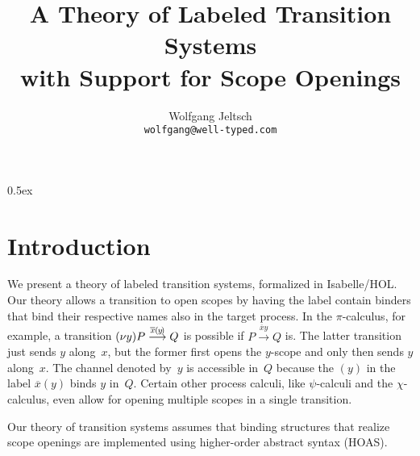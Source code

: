 \documentclass[a4paper,11pt]{article}
\newcommand{\openandsendexample}{
  (\nu y)P
  \overset{\overline{x}\hspace{-0.03em}(\hspace{-.06em}y\hspace{-.12em})}{\longrightarrow}
  Q
}
\begin{document}
\title{A Theory of Labeled Transition Systems\\with Support for Scope Openings}
\author{Wolfgang Jeltsch\\\small\texttt{wolfgang@well-typed.com}}

\maketitle

\tableofcontents

\parindent 0pt\parskip 0.5ex

\section{Introduction}

We present a theory of labeled transition systems, formalized in Isabelle/HOL. Our theory allows
a transition to open scopes by having the label contain binders that bind their respective names
also in the target process. In the $\pi$-calculus, for example, a transition $\openandsendexample$
is possible if $P \overset{\overline{x}y}{\longrightarrow} Q$ is. The latter transition just sends
$y$ along~$x$, but the former first opens the $y$-scope and only then sends $y$ along~$x$. The
channel denoted by~$y$ is accessible in~$Q$ because the $(y)$ in the label $\overline{x}(y)$ binds
$y$ in~$Q$. Certain other process calculi, like $\psi$-calculi and the $\chi$-calculus, even allow
for opening multiple scopes in a single transition.

Our theory of transition systems assumes that binding structures that realize scope openings are
implemented using higher-order abstract syntax (HOAS).


\end{document}
